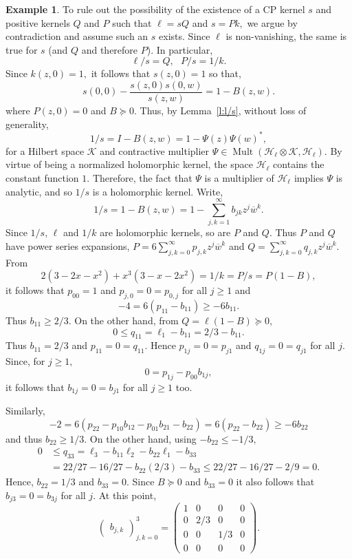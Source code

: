 \documentclass[a4paper,reqno,index]{amsart}
\numberwithin{equation}{section}
\newcommand{\Mult}{\operatorname{Mult}}
\newcommand{\cH}{\mathcal{H}}
\newcommand{\ol}[1]{\overline{#1}}
\theoremstyle{definition}
\newtheorem{example}[theorem]{Example}
\begin{document}
\begin{example}
To rule out the possibility of the existence of a CP kernel  $s$
and positive kernels $Q$ and $P$ such that $\ell=sQ$ and $s=Pk,$
  we argue by contradiction and assume such an $s$ exists. 
Since $\ell$ is non-vanishing, the same is true for $s$ (and $Q$
and therefore $P$). In particular, 
\[
  \ell/s = Q, \ \ \ P/s =1/k.
\]
Since $k(z,0)=1,$ it follows that $s(z,0)=1$ so that,
\[
  s(0,0)- \frac{s(z,0)s(0,w)}{s(z,w)} = 1 - B(z,w).
\]
 where $P(z,0)=0$ and $B\succeq 0$. Thus,
by Lemma~\ref{l:l/s}, without loss of generality,
\[
  1/s = I-B(z,w) = 1-\Psi(z)\Psi(w)^*,
\]
for a Hilbert space $\mathcal{K}$ and contractive multiplier $\Psi\in \Mult(\cH_\ell\otimes \mathcal{K},\cH_\ell).$ 
By virtue of being a normalized    holomorphic kernel,
the space $\cH_\ell$ contains the constant function $1$. Therefore, 
the fact that $\Psi$ is a multiplier of $\cH_\ell$ implies
$\Psi$ is analytic, and so $1/s$ is a   holomorphic kernel.
Write,
\[
1/s= 1-B(z,w) =1 - \sum_{j,k=1}^\infty b_{jk}z^j \ol{w}^k.
\]
Since $1/s, \, \ell$  and $1/k$ are holomorphic kernels, so are $P$ and $Q.$ Thus $P$ and $Q$ have power series expansions, $P=6 \sum_{j,k=0}^\infty  p_{j,k} z^j\ol{w}^k$ and $Q=\sum_{j,k=0}^\infty q_{j,k} z^j \ol{w}^k.$   From
 \[
  2(3-2x-x^2)+x^3(3-x-2x^2) = 1/k= P/s = P(1-B),
  \]
it follows that  $p_{00}=1$ and $p_{j,0}=0=p_{0,j}$ for all $j\ge 1$
and 
\[
 -4 = 6(p_{11} -b_{11}) \ge -6 b_{11}.
\]
 Thus $b_{11} \ge 2/3.$ On the other hand,
 from  $Q=\ell(1-B)\succeq 0,$ 
 \[
  0\le  q_{11} = \ell_{1}-b_{11} = 2/3-b_{11}.
\]
 Thus $b_{11}=2/3$ and $p_{11}=0=q_{11}$. Hence $p_{1j}=0=p_{j1}$
 and $q_{1j}=0=q_{j1}$ for all $j.$   Since, for $j\ge 1,$ 
\[
 0 = p_{1j}- p_{00}b_{1j},
\]
 it follows that $b_{1j}=0=b_{j1}$ for  all $j\ge 1$ too. 

 Similarly, 
\[
 -2 =  6( p_{22}-p_{10}b_{12} -p_{01}b_{21} -b_{22})
 = 6( p_{22} - b_{22}) \ge  -6 b_{22}
\]
and thus $b_{22}\ge 1/3.$ On the other hand, 
 using $-b_{22} \le -1/3,$ 
\[
\begin{split}
     0  & \le q_{33} = \ell_3 - b_{11}\ell_2 -b_{22}\ell_1 - b_{33}
    \\ & = 22/27 - 16/27 -b_{22} (2/3) -b_{33} \le 
    22/27-16/27- 2/9 = 0. 
\end{split}
\]
Hence, $b_{22}=1/3$ and $b_{33}=0.$  Since $B\succeq0$
and $b_{33}=0$ it also follows that $b_{j3}=0=b_{3j}$ for all $j.$  At this point,
\[
 \begin{pmatrix} b_{j,k} \end{pmatrix}_{j,k=0}^3
  = \begin{pmatrix} 1&0&0&0\\ 0& 2/3 & 0&0 \\ 0 &0& 1/3&0 \\0&0&0&0
  \end{pmatrix}.
\]


\end{example}
\end{document}
